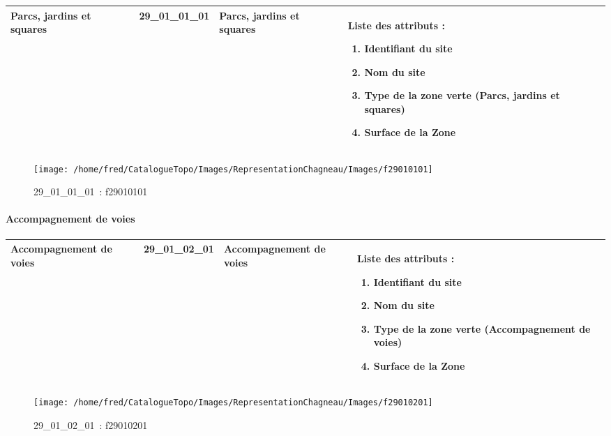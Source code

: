 \documentclass[12pt,titlepage]{book}
\begin{document}
\renewcommand{\arraystretch}{1.2}
\begin{supertabular}{|p{10cm}|c|p{13cm}|p{12cm}|}
 Parcs, jardins et squares & 29\_01\_01\_01 & Parcs, jardins et squares & Liste des attributs :
\begin{enumerate}
  \item Identifiant du site  \item Nom du site  \item Type de la zone verte (Parcs, jardins et squares)  \item Surface de la Zone\end{enumerate}
\\
\hline
\end{supertabular}
\begin{figure}[h!]
  \hfill         %
  \begin{minipage}[t]{3cm}
    \begin{center}
      \texttt{[image: /home/fred/CatalogueTopo/Images/RepresentationChagneau/Images/f29010101]}
      \caption[~29\_01\_01\_01]{\small{29\_01\_01\_01~:} \tiny{f29010101}}\label{f29010101}
    \end{center}
  \end{minipage}
\end{figure}


\paragraph{Accompagnement de voies}
\noindent
\vspace{\baselineskip}

\renewcommand{\arraystretch}{1.2}
\begin{supertabular}{|p{10cm}|c|p{13cm}|p{12cm}|}
 Accompagnement de voies & 29\_01\_02\_01 & Accompagnement de voies & Liste des attributs :
\begin{enumerate}
  \item Identifiant du site  \item Nom du site  \item Type de la zone verte (Accompagnement de voies)  \item Surface de la Zone\end{enumerate}
\\
\hline
\end{supertabular}
\begin{figure}[h!]
  \hfill         %
  \begin{minipage}[t]{3cm}
    \begin{center}
      \texttt{[image: /home/fred/CatalogueTopo/Images/RepresentationChagneau/Images/f29010201]}
      \caption[~29\_01\_02\_01]{\small{29\_01\_02\_01~:} \tiny{f29010201}}\label{f29010201}
    \end{center}
  \end{minipage}
\end{figure}
\end{document}
